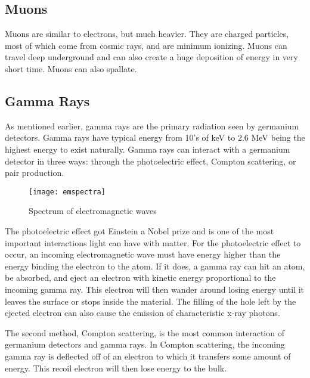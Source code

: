 \subsection{Muons}
Muons are similar to electrons, but much heavier. They are charged particles, most of which come from cosmic rays, and are minimum ionizing. 
Muons can travel deep underground and can also create a huge deposition of energy in very short time.
Muons can also spallate.

\subsection{Gamma Rays}
As mentioned earlier, gamma rays are the primary radiation seen by germanium detectors.
Gamma rays have typical energy from 10's of keV to 2.6 MeV being the highest energy to exist naturally.
Gamma rays can interact with a germanium detector in three ways: through the photoelectric effect, Compton scattering, or pair production.
\begin{figure}[htpb]
\centering
\texttt{[image: emspectra]}
\caption{Spectrum of electromagnetic waves}
\label{fig:emspectra}
\end{figure}

The photoelectric effect got Einstein a Nobel prize and is one of the most important interactions light can have with matter.
For the photoelectric effect to occur, an incoming electromagnetic wave must have energy higher than the energy binding the electron to the atom.
If it does, a gamma ray can hit an atom, be absorbed, and eject an electron with kinetic energy proportional to the incoming gamma ray.
This electron will then wander around losing energy until it leaves the surface or stops inside the material.
The filling of the hole left by the ejected electron can also cause the emission of characteristic x-ray photons.

The second method, Compton scattering, is the most common interaction of germanium detectors and gamma rays.
In Compton scattering, the incoming gamma ray is deflected off of an electron to which it transfers some amount of energy.
This recoil electron will then lose energy to the bulk.


